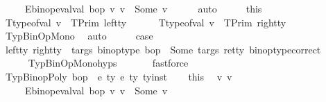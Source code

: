 \begin{isabellebody}
\ \ \ \ \ E{\isacharcolon}{\kern0pt}{\isachardoublequoteopen}binop{\isacharunderscore}{\kern0pt}eval{\isacharunderscore}{\kern0pt}val\ bop\ v{}\ v{}\ {\isacharequal}{\kern0pt}\ Some\ v{\isachardoublequoteclose}\isanewline
\ \ \ \ \isamarkupfalse%
\ auto\isanewline
\ \ \isamarkupfalse%
\ \isamarkupfalse%
\ this\ \isamarkupfalse%
\ T{}{\isacharcolon}{\kern0pt}{\isachardoublequoteopen}type{\isacharunderscore}{\kern0pt}of{\isacharunderscore}{\kern0pt}val\ v{}\ {\isacharequal}{\kern0pt}\ TPrim\ left{\isacharunderscore}{\kern0pt}ty{\isachardoublequoteclose}\ \ \isanewline
\ \ \ \ T{}{\isacharcolon}{\kern0pt}{\isachardoublequoteopen}type{\isacharunderscore}{\kern0pt}of{\isacharunderscore}{\kern0pt}val\ v{}\ {\isacharequal}{\kern0pt}\ TPrim\ right{\isacharunderscore}{\kern0pt}ty{\isachardoublequoteclose}\ \isamarkupfalse%
\ TypBinOpMono\ \isamarkupfalse%
\ auto\isanewline
\ \ \isamarkupfalse%
\ \isamarkupfalse%
\ {\isacharquery}{\kern0pt}case\ \isamarkupfalse%
\ {\isacartoucheopen}{\isacharparenleft}{\kern0pt}left{\isacharunderscore}{\kern0pt}ty{\isacharcomma}{\kern0pt}\ right{\isacharunderscore}{\kern0pt}ty{\isacharparenright}{\kern0pt}\ {\isasymin}\ targs{\isacartoucheclose}\ {\isacartoucheopen}binop{\isacharunderscore}{\kern0pt}type\ bop\ {\isacharequal}{\kern0pt}\ Some\ {\isacharparenleft}{\kern0pt}targs{\isacharcomma}{\kern0pt}\ ret{\isacharunderscore}{\kern0pt}ty{\isacharparenright}{\kern0pt}{\isacartoucheclose}\ binop{\isacharunderscore}{\kern0pt}type{\isacharunderscore}{\kern0pt}correct\ \ \ \ \ \ \isanewline
\ \ \ \ \isamarkupfalse%
\ TypBinOpMono{\isachardot}{\kern0pt}hyps{\isacharparenleft}{\kern0pt}{}{\isacharparenright}{\kern0pt}\ \isanewline
\ \ \ \ \isamarkupfalse%
\ fastforce\isanewline
{}\isamarkupfalse%
\isanewline
\ \ \isamarkupfalse%
\ {\isacharparenleft}{\kern0pt}TypBinopPoly\ bop\ {\isasymDelta}\ e{}\ ty{}\ e{}\ ty{}\ ty{\isacharunderscore}{\kern0pt}inst{\isacharparenright}{\kern0pt}\isanewline
\ \ \isamarkupfalse%
\ this\ \isamarkupfalse%
\ v{}\ v{}\ \ \isanewline
\ \ \ \ \ E{\isacharcolon}{\kern0pt}{\isachardoublequoteopen}binop{\isacharunderscore}{\kern0pt}eval{\isacharunderscore}{\kern0pt}val\ bop\ v{}\ v{}\ {\isacharequal}{\kern0pt}\ Some\ v{\isachardoublequoteclose}\ \isamarkupfalse%

\end{isabellebody}
